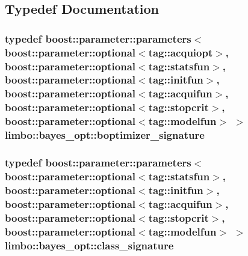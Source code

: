 \subsection{Typedef Documentation}
\hypertarget{namespacelimbo_1_1bayes__opt_aef2e9f6b642760d428c30abd9d12a61e}{}
\subsubsection[{boptimizer\+\_\+signature}]{\setlength{\rightskip}{0pt plus 5cm}typedef boost\+::parameter\+::parameters$<$boost\+::parameter\+::optional$<$tag\+::acquiopt$>$, boost\+::parameter\+::optional$<$tag\+::statsfun$>$, boost\+::parameter\+::optional$<$tag\+::initfun$>$, boost\+::parameter\+::optional$<$tag\+::acquifun$>$, boost\+::parameter\+::optional$<$tag\+::stopcrit$>$, boost\+::parameter\+::optional$<$tag\+::modelfun$>$ $>$ {\bf limbo\+::bayes\+\_\+opt\+::boptimizer\+\_\+signature}}\label{namespacelimbo_1_1bayes__opt_aef2e9f6b642760d428c30abd9d12a61e}
\hypertarget{namespacelimbo_1_1bayes__opt_ac9ebb02d293842625e1ee8bac9710989}{}
\subsubsection[{class\+\_\+signature}]{\setlength{\rightskip}{0pt plus 5cm}typedef boost\+::parameter\+::parameters$<$boost\+::parameter\+::optional$<$tag\+::statsfun$>$, boost\+::parameter\+::optional$<$tag\+::initfun$>$, boost\+::parameter\+::optional$<$tag\+::acquifun$>$, boost\+::parameter\+::optional$<$tag\+::stopcrit$>$, boost\+::parameter\+::optional$<$tag\+::modelfun$>$ $>$ {\bf limbo\+::bayes\+\_\+opt\+::class\+\_\+signature}}\label{namespacelimbo_1_1bayes__opt_ac9ebb02d293842625e1ee8bac9710989}
